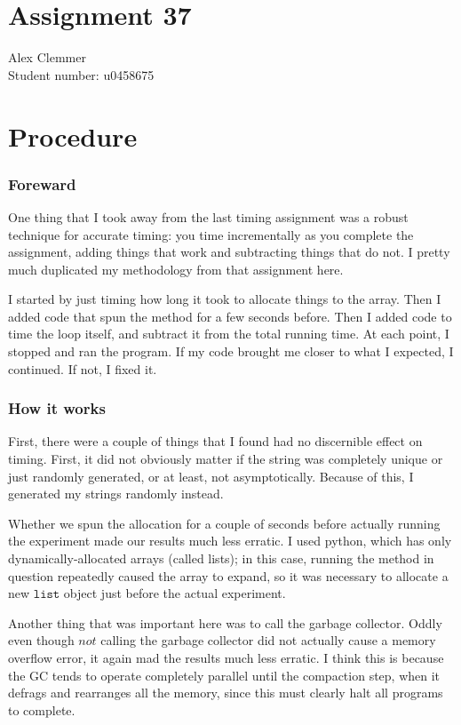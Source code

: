 \documentclass[a4paper]{article}
\begin{document}
\section*{Assignment 37}
Alex Clemmer\\
Student number: u0458675

\section*{Procedure}

\subsubsection*{Foreward} One thing that I took away from the last timing assignment was a robust technique for accurate timing: you time incrementally as you complete the assignment, adding things that work and subtracting things that do not. I pretty much duplicated my methodology from that assignment here.

I started by just timing how long it took to allocate things to the array. Then I added code that spun the method for a few seconds before. Then I added code to time the loop itself, and subtract it from the total running time. At each point, I stopped and ran the program. If my code brought me closer to what I expected, I continued. If not, I fixed it.

\subsubsection*{How it works}

First, there were a couple of things that I found had no discernible effect on timing. First, it did not obviously matter if the string was completely unique or just randomly generated, or at least, not asymptotically. Because of this, I generated my strings randomly instead.

Whether we spun the allocation for a couple of seconds before actually running the experiment made our results much less erratic. I used python, which has only dynamically-allocated arrays (called lists); in this case, running the method in question repeatedly caused the array to expand, so it was necessary to allocate a new $\texttt{list}$ object just before the actual experiment.

Another thing that was important here was to call the garbage collector. Oddly even though $\textit{not}$ calling the garbage collector did not actually cause a memory overflow error, it again mad the results much less erratic. I think this is because the GC tends to operate completely parallel until the compaction step, when it defrags and rearranges all the memory, since this must clearly halt all programs to complete.
\end{document}
